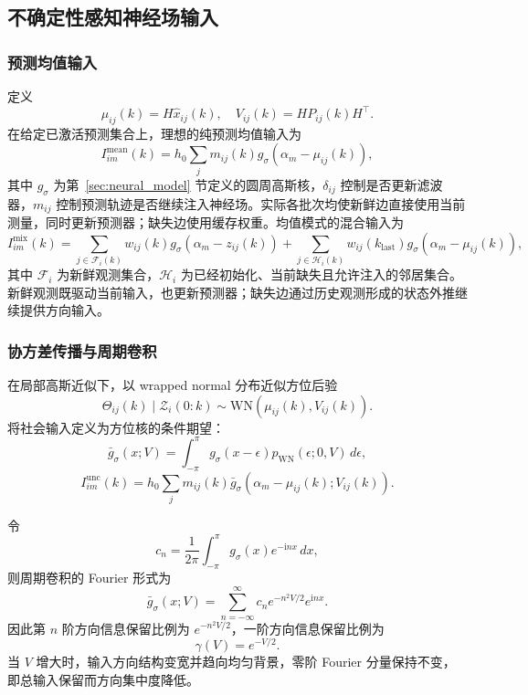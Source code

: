 \documentclass[UTF8,fontset=windows,11pt]{ctexart}
\begin{document}
\subsection{不确定性感知神经场输入}

\subsubsection{预测均值输入}
定义
\begin{equation}
 \mu_{ij}(k)=H\hat x_{ij}(k),\quad V_{ij}(k)=HP_{ij}(k)H^\top.
\end{equation}
在给定已激活预测集合上，理想的纯预测均值输入为
\begin{equation}
 I^{\mathrm{mean}}_{im}(k)=h_0\sum_jm_{ij}(k)
 g_\sigma(\alpha_m-\mu_{ij}(k)),
\end{equation}
其中 $g_\sigma$ 为第~\ref{sec:neural_model} 节定义的圆周高斯核，$\delta_{ij}$ 控制是否更新滤波器，$m_{ij}$ 控制预测轨迹是否继续注入神经场。实际各批次均使新鲜边直接使用当前测量，同时更新预测器；缺失边使用缓存权重。均值模式的混合输入为
\begin{equation}
 I^{\mathrm{mix}}_{im}(k)
 =\sum_{j\in\mathcal F_i(k)}w_{ij}(k)g_\sigma(\alpha_m-z_{ij}(k))
 +\sum_{j\in\mathcal H_i(k)}w_{ij}(k_{\mathrm{last}})
 g_\sigma(\alpha_m-\mu_{ij}(k)),
 \label{eq:pilot_causal_input}
\end{equation}
其中 $\mathcal F_i$ 为新鲜观测集合，$\mathcal H_i$ 为已经初始化、当前缺失且允许注入的邻居集合。新鲜观测既驱动当前输入，也更新预测器；缺失边通过历史观测形成的状态外推继续提供方向输入。

\subsubsection{协方差传播与周期卷积}
在局部高斯近似下，以 wrapped normal 分布近似方位后验
\begin{equation}
 \Theta_{ij}(k)\mid\mathcal Z_i(0:k)\sim\mathrm{WN}(\mu_{ij}(k),V_{ij}(k)).
\end{equation}
将社会输入定义为方位核的条件期望：
\begin{equation}
 \bar g_\sigma(x;V)=\int_{-\pi}^{\pi}g_\sigma(x-\epsilon)p_{\mathrm{WN}}(\epsilon;0,V)\,d\epsilon,
\end{equation}
\begin{equation}
 I^{\mathrm{unc}}_{im}(k)=h_0\sum_jm_{ij}(k)\bar g_\sigma(\alpha_m-\mu_{ij}(k);V_{ij}(k)).
\end{equation}

令
\begin{equation}
 c_n=\frac{1}{2\pi}\int_{-\pi}^{\pi}g_\sigma(x)e^{-\mathrm inx}\,dx,
\end{equation}
则周期卷积的 Fourier 形式为
\begin{equation}
 \bar g_\sigma(x;V)=\sum_{n=-\infty}^{\infty}c_n e^{-n^2V/2}e^{\mathrm inx}.
\end{equation}
因此第 $n$ 阶方向信息保留比例为 $e^{-n^2V/2}$，一阶方向信息保留比例为
\begin{equation}
 \gamma(V)=e^{-V/2}.
\end{equation}
当 $V$ 增大时，输入方向结构变宽并趋向均匀背景，零阶 Fourier 分量保持不变，即总输入保留而方向集中度降低。
\end{document}
